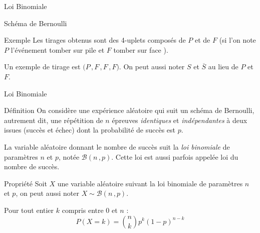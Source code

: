 \documentclass{cours}
\begin{document}
\begin{Gpartie}{Loi Binomiale}
\begin{Spartie}{Schéma de Bernoulli}
\begin{SSpartie}{Exemple}
                Les tirages obtenus sont des 4-uplets composés de $P$ et de $F$ (si l'on note $P$ l'événement \og tomber sur pile \fg{} et $F$ \og tomber sur face \fg{}).
                
                Un exemple de tirage est $\big(P\,, F\,, F\,, F\big)$. On peut aussi noter $S$ et $\overline{S}$ au lieu de $P$ et $F$.
            \end{SSpartie}
        \end{Spartie}
        \pagebreak
        \begin{Spartie}{Loi Binomiale} 
            \begin{SSpartie}{Définition} 
                On considère une expérience aléatoire qui suit un schéma de Bernoulli, autrement dit, une répétition de $n$ épreuves \emph{identiques} et \emph{indépendantes} à deux issues (succès et échec) dont la probabilité de succès est $p$.

                La variable aléatoire donnant le nombre de succès suit la \emph{loi binomiale} de paramètres $n$ et $p$, notée $\mathcal{B}(n\,, p)$. Cette loi est aussi parfois appelée loi du nombre de succès.
            \end{SSpartie}
            \begin{SSpartie}{Propriété} 
                Soit $X$ une variable aléatoire suivant la loi binomiale de paramètres $n$ et $p$, on peut aussi noter $X\sim\mathcal{B}(n\,, p)$.

                Pour tout entier $k$ compris entre $0$ et $n$ :
                \[\boxed{P(X=k)=\binom{n}{k}p^k(1-p)^{n-k}}\]


\end{SSpartie}
\end{Spartie}
\end{Gpartie}
\end{document}
